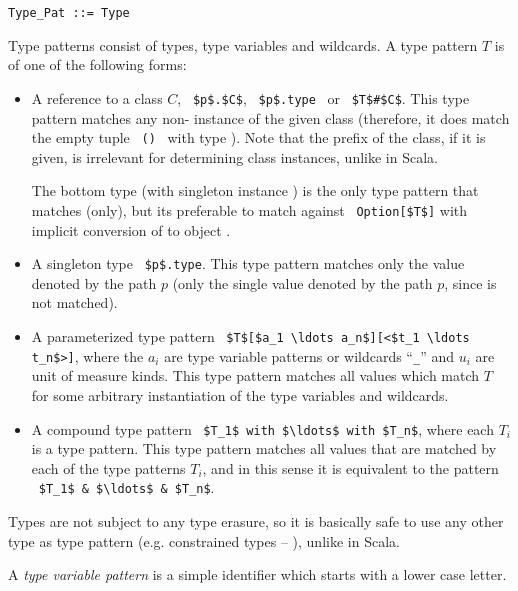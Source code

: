 \syntax\begin{lstlisting}
Type_Pat ::= Type
\end{lstlisting}

Type patterns consist of types, type variables and wildcards. A type pattern $T$ is of one of the following forms: 
\begin{itemize}
\item[]
A reference to a class $C$, ~\lstinline!$p$.$C$!, ~\lstinline!$p$.type!~ or ~\lstinline!$T$#$C$!. This type pattern matches any non- instance of the given class (therefore, it does match the empty tuple ~\lstinline!()!~ with type ). Note that the prefix of the class, if it is given, is irrelevant for determining class instances, unlike in Scala. 

The bottom type  (with singleton instance ) is the only type pattern that matches  (only), but its preferable to match against ~\lstinline!Option[$T$]! with implicit conversion of  to object . 

\item[]
A singleton type ~\lstinline!$p$.type!. This type pattern matches only the value denoted by the path $p$ (only the single value denoted by the path $p$, since  is not matched). 

\item[]
A parameterized type pattern ~\lstinline!$T$[$a_1 \ldots a_n$][<$t_1 \ldots t_n$>]!, where the $a_i$ are type variable patterns or wildcards ``\lstinline!_!'' and $u_i$ are unit of measure kinds. This type pattern matches all values which match $T$ for some arbitrary instantiation of the type variables and wildcards.  

\item[]
A compound type pattern ~\lstinline!$T_1$ with $\ldots$ with $T_n$!, where each $T_i$ is a type pattern. This type pattern matches all values that are matched by each of the type patterns $T_i$, and in this sense it is equivalent to the pattern ~\lstinline!$T_1$ & $\ldots$ & $T_n$!. 
\end{itemize}

Types are not subject to any type erasure, so it is basically safe to use any other type as type pattern (e.g. constrained types -- ), unlike in Scala. 

A {\em type variable pattern} is a simple identifier which starts with a lower case letter. 







